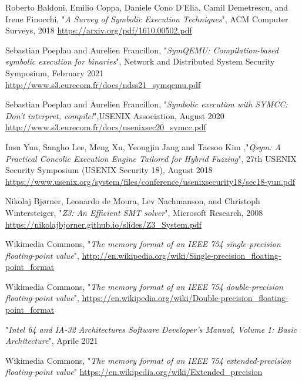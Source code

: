 \documentclass[Lau, oneside]{sapthesis}%
\begin{document}
\backmatter
{}
\begin{thebibliography}{0}

Roberto Baldoni, Emilio Coppa, Daniele Cono D'Elia, Camil Demetrescu, and Irene Finocchi, "\textit{A Survey of Symbolic Execution Techniques}", ACM Computer Surveys, 2018
\newline
\url{https://arxiv.org/pdf/1610.00502.pdf}

Sebastian Poeplau and Aurelien Francillon, "\textit{SymQEMU:
Compilation-based symbolic execution for binaries}", Network and Distributed System Security Symposium, February 2021
\newline
\url{http://www.s3.eurecom.fr/docs/ndss21_symqemu.pdf}

Sebastian Poeplau and Aurelien Francillon, "\textit{Symbolic execution with SYMCC: Don’t interpret, compile!}",USENIX Association, August 2020
\newline
\url{http://www.s3.eurecom.fr/docs/usenixsec20_symcc.pdf}

Insu Yun, Sangho Lee, Meng Xu, Yeongjin Jang and Taesoo Kim ,"\textit{Qsym: A Practical Concolic Execution Engine Tailored for Hybrid Fuzzing}", 27th USENIX Security Symposium (USENIX Security 18), August 2018
\newline
\url{https://www.usenix.org/system/files/conference/usenixsecurity18/sec18-yun.pdf}

Nikolaj Bjørner, Leonardo de Moura, Lev Nachmanson, and Christoph Wintersteiger, "\textit{Z3: An Efficient SMT solver}", Microsoft Research, 2008
\newline
\url{https://nikolajbjorner.github.io/slides/Z3_System.pdf}

Wikimedia Commons, "\textit{The memory format of an IEEE 754 single-precision floating-point value}",
\url{http://en.wikipedia.org/wiki/Single-precision_floating-point_format}

Wikimedia Commons, "\textit{The memory format of an IEEE 754 double-precision floating-point value}", 
\url{https://en.wikipedia.org/wiki/Double-precision_floating-point_format}

"\textit{Intel 64 and IA-32 Architectures Software Developer's Manual, Volume 1: Basic Architecture}", Aprile 2021

Wikimedia Commons, "\textit{The memory format of an IEEE 754 extended-precision floating-point value}"
\newline
\url{https://en.wikipedia.org/wiki/Extended_precision}



\end{thebibliography}
\end{document}
